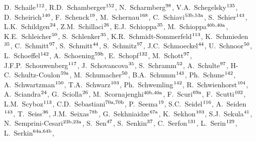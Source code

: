\begin{flushleft}
D.~Schaile$^\textrm{\scriptsize 112}$,    
R.D.~Schamberger$^\textrm{\scriptsize 152}$,    
N.~Scharmberg$^\textrm{\scriptsize 98}$,    
V.A.~Schegelsky$^\textrm{\scriptsize 135}$,    
D.~Scheirich$^\textrm{\scriptsize 140}$,    
F.~Schenck$^\textrm{\scriptsize 19}$,    
M.~Schernau$^\textrm{\scriptsize 168}$,    
C.~Schiavi$^\textrm{\scriptsize 53b,53a}$,    
S.~Schier$^\textrm{\scriptsize 143}$,    
L.K.~Schildgen$^\textrm{\scriptsize 24}$,    
Z.M.~Schillaci$^\textrm{\scriptsize 26}$,    
E.J.~Schioppa$^\textrm{\scriptsize 35}$,    
M.~Schioppa$^\textrm{\scriptsize 40b,40a}$,    
K.E.~Schleicher$^\textrm{\scriptsize 50}$,    
S.~Schlenker$^\textrm{\scriptsize 35}$,    
K.R.~Schmidt-Sommerfeld$^\textrm{\scriptsize 113}$,    
K.~Schmieden$^\textrm{\scriptsize 35}$,    
C.~Schmitt$^\textrm{\scriptsize 97}$,    
S.~Schmitt$^\textrm{\scriptsize 44}$,    
S.~Schmitz$^\textrm{\scriptsize 97}$,    
J.C.~Schmoeckel$^\textrm{\scriptsize 44}$,    
U.~Schnoor$^\textrm{\scriptsize 50}$,    
L.~Schoeffel$^\textrm{\scriptsize 142}$,    
A.~Schoening$^\textrm{\scriptsize 59b}$,    
E.~Schopf$^\textrm{\scriptsize 132}$,    
M.~Schott$^\textrm{\scriptsize 97}$,    
J.F.P.~Schouwenberg$^\textrm{\scriptsize 117}$,    
J.~Schovancova$^\textrm{\scriptsize 35}$,    
S.~Schramm$^\textrm{\scriptsize 52}$,    
A.~Schulte$^\textrm{\scriptsize 97}$,    
H-C.~Schultz-Coulon$^\textrm{\scriptsize 59a}$,    
M.~Schumacher$^\textrm{\scriptsize 50}$,    
B.A.~Schumm$^\textrm{\scriptsize 143}$,    
Ph.~Schune$^\textrm{\scriptsize 142}$,    
A.~Schwartzman$^\textrm{\scriptsize 150}$,    
T.A.~Schwarz$^\textrm{\scriptsize 103}$,    
Ph.~Schwemling$^\textrm{\scriptsize 142}$,    
R.~Schwienhorst$^\textrm{\scriptsize 104}$,    
A.~Sciandra$^\textrm{\scriptsize 24}$,    
G.~Sciolla$^\textrm{\scriptsize 26}$,    
M.~Scornajenghi$^\textrm{\scriptsize 40b,40a}$,    
F.~Scuri$^\textrm{\scriptsize 69a}$,    
F.~Scutti$^\textrm{\scriptsize 102}$,    
L.M.~Scyboz$^\textrm{\scriptsize 113}$,    
C.D.~Sebastiani$^\textrm{\scriptsize 70a,70b}$,    
P.~Seema$^\textrm{\scriptsize 19}$,    
S.C.~Seidel$^\textrm{\scriptsize 116}$,    
A.~Seiden$^\textrm{\scriptsize 143}$,    
T.~Seiss$^\textrm{\scriptsize 36}$,    
J.M.~Seixas$^\textrm{\scriptsize 78b}$,    
G.~Sekhniaidze$^\textrm{\scriptsize 67a}$,    
K.~Sekhon$^\textrm{\scriptsize 103}$,    
S.J.~Sekula$^\textrm{\scriptsize 41}$,    
N.~Semprini-Cesari$^\textrm{\scriptsize 23b,23a}$,    
S.~Sen$^\textrm{\scriptsize 47}$,    
S.~Senkin$^\textrm{\scriptsize 37}$,    
C.~Serfon$^\textrm{\scriptsize 131}$,    
L.~Serin$^\textrm{\scriptsize 129}$,    
L.~Serkin$^\textrm{\scriptsize 64a,64b}$,    

\end{flushleft}
